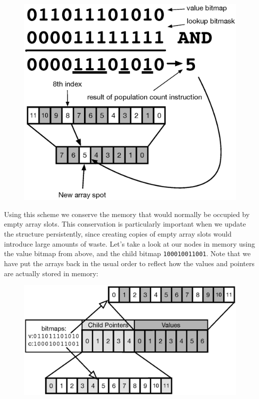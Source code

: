 \documentclass[preprint]{sigplanconf}
\begin{document}
\begin{figure}[H]
\includegraphics[scale=.45]{bitmask2}
\centering
\end{figure}
Using this scheme we conserve the memory that would normally be occupied by empty array slots.
This conservation is particularly important when we update the structure persistently, since creating copies of empty array slots would introduce large amounts of waste.
Let's take a look at our nodes in memory using the value bitmap from above, and the child bitmap \texttt{100010011001}.
Note that we have put the arrays back in the usual order to reflect how the values and pointers are actually stored in memory:
\begin{figure}[H]
\includegraphics[scale=.45]{nodewithbitmaps}
\centering
\end{figure}
\end{document}
